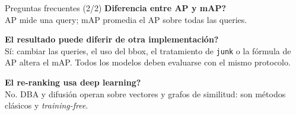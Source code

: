 \documentclass[aspectratio=169]{beamer}
\begin{document}
\begin{frame}{Preguntas frecuentes (2/2)}
  \small
  \textbf{Diferencia entre AP y mAP?}\\
  AP mide una query; mAP promedia el AP sobre todas las queries.
  \vspace{0.4em}

  \textbf{El resultado puede diferir de otra implementaci\'on?}\\
  S\'i: cambiar las queries, el uso del bbox, el tratamiento de \texttt{junk} o la f\'ormula de AP altera el mAP. Todos los modelos deben evaluarse con el mismo protocolo.
  \vspace{0.4em}

  \textbf{El re-ranking usa deep learning?}\\
  No. DBA y difusi\'on operan sobre vectores y grafos de similitud: son m\'etodos cl\'asicos y \emph{training-free}.
\end{frame}
\end{document}
